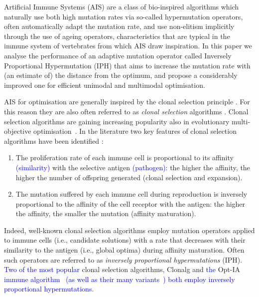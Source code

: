 \documentclass[lettersize,journal]{IEEEtran}
\newcommand{\new}[1]{\textcolor{blue}{#1}}
\begin{document}
Artificial Immune Systems (AIS) are a class of bio-inspired algorithms which naturally use both high mutation rates via so-called hypermutation operators, often automatically adapt the mutation rate,  and use non-elitism implicitly through the use of ageing operators, characteristics that are typical in the immune system of vertebrates from which AIS draw inspiration. In this paper we analyse the performance of an adaptive mutation operator called Inversely Proportional Hypermutation (IPH) that aims to increase the mutation rate with (an estimate of) the distance from the optimum, and propose a considerably improved one for efficient unimodal and multimodal optimisation.

AIS for optimisation \cite{DeCastroTimmisBook,MO2020AAAI} are generally inspired by the clonal selection principle  \cite{Burnet1959}.
For this reason they are also often referred  to as {\it clonal selection} algorithms \cite{DeCastroTimmisBook}. 
Clonal selection algorithms are gaining increasing popularity also in evolutionary multi-objective optimisation~\cite{CoelloEMO2025,CoelloTEVC15,EMOReview}. 
In the literature two key features of clonal selection algorithms have been identified \cite{Brownlee2007}: 
\begin{enumerate}
	\item  The proliferation rate of each immune cell is proportional to its affinity \new{(similarity)} with the selective antigen \new{(pathogen)}: the higher the affinity, 
	the higher the number of offspring generated (clonal selection and expansion). %
	\item The mutation suffered by each immune cell during reproduction is inversely proportional to the affinity of the cell receptor with the antigen: the higher the affinity, 
	the smaller the mutation (affinity maturation).
\end{enumerate}
Indeed, well-known clonal selection algorithms employ mutation operators applied to immune cells (i.e., candidate solutions) with a rate that decreases with their similarity to the 
antigen (i.e., global optima) during affinity maturation. Often such operators are referred to as {\it inversely proportional hypermutations} (IPH). 
\new{Two of the most popular} clonal selection algorithms, Clonalg \cite{DecastroVonzuben2002}   and \new{the} Opt-IA \new{immune algorithm~\cite{CutelloNicosiaPavoneTimmis2007} (as well as their many variants~\cite{ClonalSelectionReview}) both employ inversely proportional hypermutations}.  %
\end{document}
